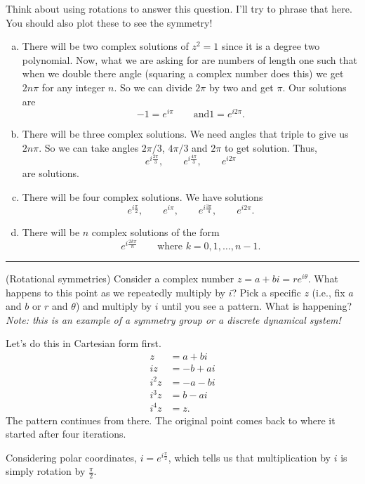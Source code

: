 \documentclass[12pt]{article} %
\begin{document}
\begin{solution}
Think about using rotations to answer this question.  I'll try to phrase that here. You should also plot these to see the symmetry!
\begin{enumerate}[(a)]
    \item There will be two complex solutions of $z^2=1$ since it is a degree two polynomial.  Now, what we are asking for are numbers of length one such that when we double there angle (squaring a complex number does this) we get $2n\pi$ for any integer $n$.  So we can divide $2\pi$ by two and get $\pi$. Our solutions are
    \[
    -1=e^{i\pi} \qquad \textrm{and} 1=e^{i2\pi}.
    \]
    \item There will be three complex solutions. We need angles that triple to give us $2n\pi$.  So we can take angles $2\pi/3$, $4\pi/3$ and $2\pi$ to get solution. Thus,
    \[
    e^{i\frac{2\pi}{3}}, \qquad e^{i\frac{4\pi}{3}}, \qquad e^{i2\pi}
    \]
    are solutions.
    \item There will be four complex solutions. We have solutions
    \[
    e^{i\frac{\pi}{2}}, \qquad e^{i\pi}, \qquad e^{i\frac{3\pi}{4}}, \qquad e^{i2\pi}.
    \]
    \item There will be $n$ complex solutions of the form
    \[
    e^{i\frac{2k\pi}{n}} \qquad \textrm{where $k=0,1,\dots,n-1$}.
    \]
\end{enumerate}
\end{solution}


\hrule
\begin{problem}
(Rotational symmetries) Consider a complex number $z=a+bi=re^{i\theta}$. What happens to this point as we repeatedly multiply by $i$? Pick a specific $z$ (i.e., fix $a$ and $b$ or $r$ and $\theta$) and multiply by $i$ until you see a pattern.  What is happening? \emph{Note: this is an example of a symmetry group or a discrete dynamical system!}
\end{problem}

\begin{solution}
Let's do this in Cartesian form first.
\begin{align*}
    z &= a+bi\\
    iz &= -b+ai\\
    i^2z &= -a-bi\\
    i^3z &= b-ai\\
    i^4z &= z.
\end{align*}
The pattern continues from there. The original point comes back to where it started after four iterations. 

Considering polar coordinates, $i=e^{i\frac{\pi}{2}}$, which tells us that multiplication by $i$ is simply rotation by $\frac{\pi}{2}$.
\end{solution}
\end{document}
